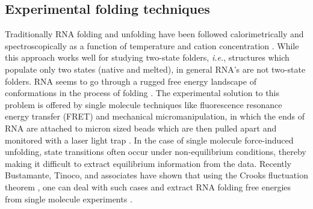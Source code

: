 \subsection{Experimental folding techniques}
Traditionally RNA folding and unfolding have been followed
calorimetrically and spectroscopically as a function of temperature
and cation concentration \cite{bloomfield2000}. While this approach
works well for studying two-state folders, \textit{i.e.}, structures which
populate only two states (native and melted), in general RNA's are
not two-state folders. RNA seems to go through a rugged free energy
landscape of conformations in the process of folding
\cite{zhuang2003}. The experimental solution to this problem is
offered by single molecule techniques like fluorescence resonance
energy transfer (FRET) and mechanical micromanipulation, in which
the ends of RNA are attached to micron sized beads which are then
pulled apart and monitored with a laser light trap
\cite{liphardt2001, onoa2004, tinoco2004, hyeon2005}. In the case of
single molecule force-induced unfolding, state transitions often occur under
non-equilibrium conditions, thereby making it difficult to extract
equilibrium information from the data. Recently Bustamante, Tinoco,
and associates have shown that using the Crooks fluctuation theorem
\cite{crooks1999}, one can deal with such cases and extract RNA
folding free energies from single molecule experiments
\cite{collin2005}.


